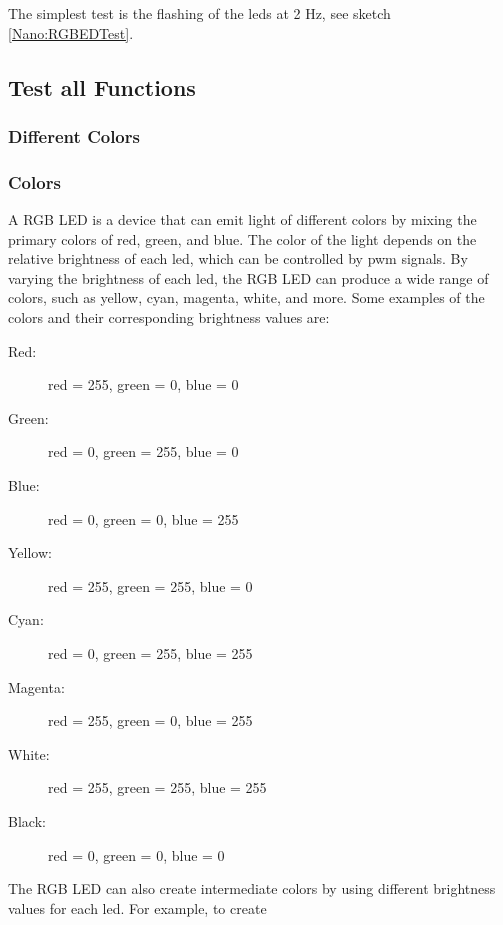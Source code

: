 The simplest test is the flashing of the \ac{led}s at 2 Hz, see sketch \ref{Nano:RGBEDTest}.

{
    \label{Nano:RGBLEDTest}
}


\subsection{Test all Functions}

\subsubsection{Different Colors}


\subsubsection{Colors}

A RGB LED is a device that can emit light of different colors by mixing the primary colors of red, green, and blue. The color of the light depends on the relative brightness of each \ac{led}, which can be controlled by \ac{pwm} signals. By varying the brightness of each \ac{led}, the RGB LED can produce a wide range of colors, such as yellow, cyan, magenta, white, and more. Some examples of the colors and their corresponding brightness values are:

\begin{description}
    \item [Red:] red = 255, green = 0, blue = 0
    \item [Green:] red = 0, green = 255, blue = 0
    \item [Blue:] red = 0, green = 0, blue = 255
    \item [Yellow:] red = 255, green = 255, blue = 0
    \item [Cyan:] red = 0, green = 255, blue = 255
    \item [Magenta:] red = 255, green = 0, blue = 255
    \item [White:] red = 255, green = 255, blue = 255
    \item [Black:] red = 0, green = 0, blue = 0
\end{description}

\medskip

The RGB LED can also create intermediate colors by using different brightness values for each \ac{led}. For example, to create

